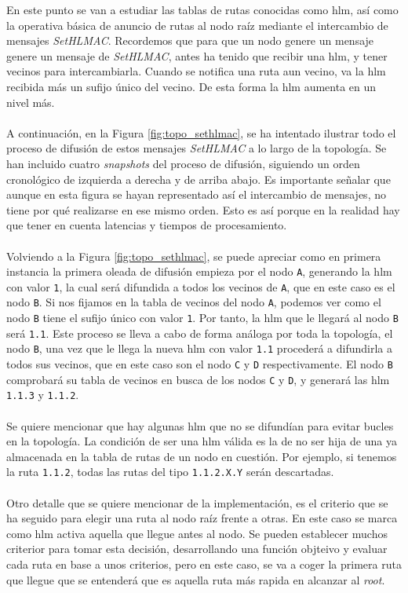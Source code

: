 En este punto se van a estudiar las tablas de rutas conocidas como \gls{hlm}, así como la operativa básica de anuncio de rutas al nodo raíz mediante el intercambio de mensajes \textit{SetHLMAC}. Recordemos que para que un nodo genere un mensaje genere un mensaje de \textit{SetHLMAC}, antes ha tenido que recibir una \gls{hlm}, y tener vecinos para intercambiarla. Cuando se notifica una ruta aun vecino, va la \gls{hlm} recibida más un sufijo único del vecino. De esta forma la \gls{hlm} aumenta en un nivel más.\\
\\
A continuación, en la Figura \ref{fig:topo_sethlmac}, se ha intentado ilustrar todo el proceso de difusión de estos mensajes \textit{SetHLMAC} a lo largo de la topología. Se han incluido cuatro \textit{snapshots} del proceso de difusión, siguiendo un orden cronológico de izquierda a derecha y de arriba abajo. Es importante señalar que aunque en esta figura se hayan representado así el intercambio de mensajes, no tiene por qué realizarse en ese mismo orden. Esto es así porque en la realidad hay que tener en cuenta latencias y tiempos de procesamiento.\\
\\
Volviendo a la Figura \ref{fig:topo_sethlmac}, se puede apreciar como en primera instancia la primera oleada de difusión empieza por el nodo \texttt{A}, generando la \gls{hlm} con valor \texttt{1}, la cual será difundida a todos los vecinos de \texttt{A}, que en este caso es el nodo \texttt{B}. Si nos fijamos en la tabla de vecinos del nodo \texttt{A}, podemos ver como el nodo \texttt{B} tiene el sufijo único con valor \texttt{1}. Por tanto, la \gls{hlm} que le llegará al nodo \texttt{B} será \texttt{1.1}. Este proceso se lleva a cabo de forma análoga por toda la topología, el nodo \texttt{B}, una vez que le llega la nueva \gls{hlm} con valor \texttt{1.1} procederá a difundirla a todos sus vecinos, que en este caso son el nodo \texttt{C} y \texttt{D} respectivamente. El nodo \texttt{B} comprobará su tabla de vecinos en busca de los  nodos \texttt{C} y \texttt{D}, y generará las \gls{hlm} \texttt{1.1.3} y \texttt{1.1.2}.\\
\\
Se quiere mencionar que hay algunas \gls{hlm} que no se difundían para evitar bucles en la topología.  La condición de ser una \gls{hlm} válida es la de no ser hija de una ya almacenada en la tabla de rutas de un nodo en cuestión. Por ejemplo, si tenemos la ruta \texttt{1.1.2}, todas las rutas del tipo \texttt{1.1.2.X.Y} serán descartadas.\\
\\
Otro detalle que se quiere mencionar de la implementación, es el criterio que se ha seguido para elegir una ruta al nodo raíz frente a otras. En este caso se marca como \gls{hlm} activa aquella que llegue antes al nodo. Se pueden establecer muchos criterior para tomar esta decisión, desarrollando una función objteivo y evaluar cada ruta en base a unos criterios, pero en este caso, se va a coger la primera ruta que llegue que se entenderá que es aquella ruta más rapida en alcanzar al \textit{root}.\\


